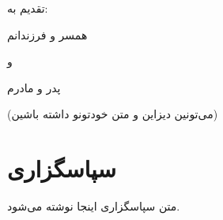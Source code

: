 \vspace*{3cm}
{{\large
	تقدیم به:}
	
	\begin{center}
		\nastaliq
		همسر و فرزندانم
		
		\vspace{1cm}
		و
		
		\vspace{1cm}
		پدر و مادرم
	\end{center}
	(می‌تونین دیزاین و متن خودتونو داشته باشین)
}

\clearpage

\section*{سپاسگزاری}
متن سپاسگزاری اینجا نوشته می‌شود.